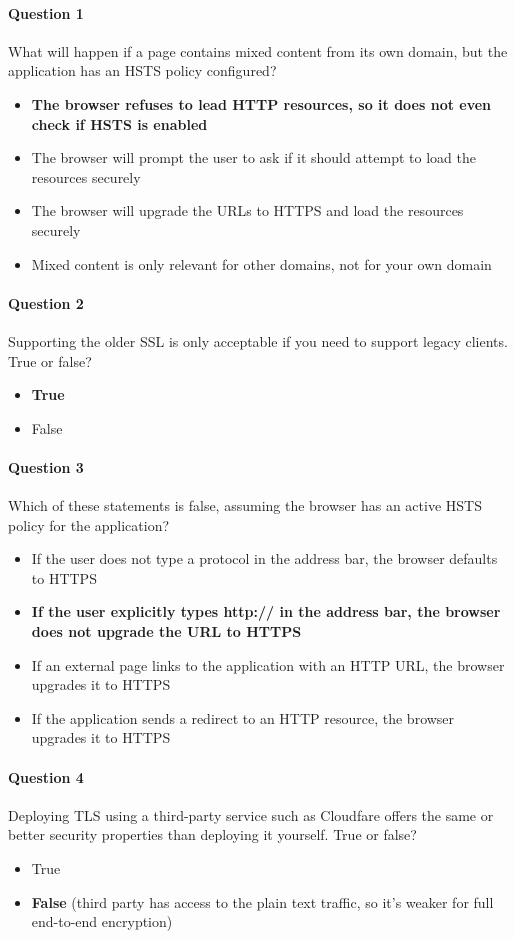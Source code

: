 \documentclass[titlepage]{article}
\begin{document}
    \paragraph{Question 1} What will happen if a page contains mixed content from its own domain, but the application has an HSTS policy configured?
    \begin{itemize}
        \item \textbf{The browser refuses to lead HTTP resources, so it does not even check if HSTS is enabled} \checkmark
        \item The browser will prompt the user to ask if it should attempt to load the resources securely
        \item The browser will upgrade the URLs to HTTPS and load the resources securely
        \item Mixed content is only relevant for other domains, not for your own domain
    \end{itemize}
    \paragraph{Question 2} Supporting the older SSL is only acceptable if you need to support legacy clients. True or false?
    \begin{itemize}
        \item \textbf{True} \checkmark
        \item False
    \end{itemize}
    \paragraph{Question 3} Which of these statements is false, assuming the browser has an active HSTS policy for the application?
    \begin{itemize}
        \item If the user does not type a protocol in the address bar, the browser defaults to HTTPS
        \item \textbf{If the user explicitly types http:// in the address bar, the browser does not upgrade the URL to HTTPS} \checkmark
        \item If an external page links to the application with an HTTP URL, the browser upgrades it to HTTPS
        \item If the application sends a redirect to an HTTP resource, the browser upgrades it to HTTPS
    \end{itemize}
    \paragraph{Question 4} Deploying TLS using a third-party service such as Cloudfare offers the same or better security properties than deploying it yourself. True or false?
    \begin{itemize}
        \item True
        \item \textbf{False} \checkmark (third party has access to the plain text traffic, so it's weaker for full end-to-end encryption)
    \end{itemize}
\end{document}

